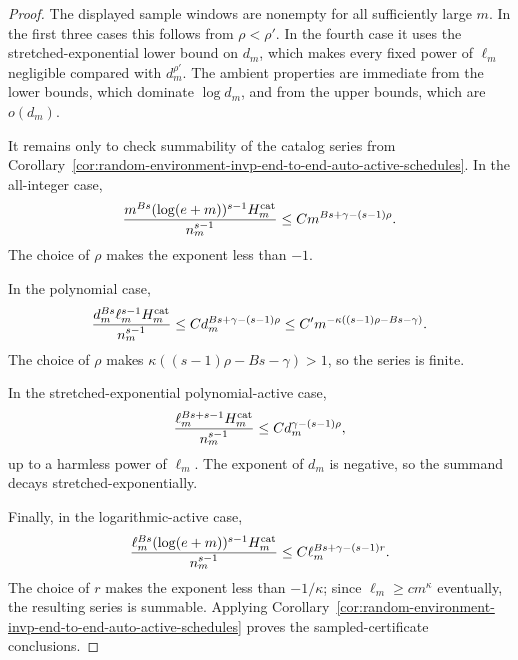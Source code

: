 \documentclass[11pt]{amsart}
\numberwithin{equation}{section}
\theoremstyle{definition}
\theoremstyle{remark}
\begin{document}
\begin{proof}
The displayed sample windows are nonempty for all sufficiently large \(m\).  In
the first three cases this follows from \(\rho<\rho'\).  In the fourth case it
uses the stretched-exponential lower bound on \(d_m\), which makes every fixed
power of \(\ell_m\) negligible compared with \(d_m^{\rho'}\).  The ambient
properties are immediate from the lower bounds, which dominate \(\log d_m\), and
from the upper bounds, which are \(o(d_m)\).

It remains only to check summability of the catalog series from
Corollary~\ref{cor:random-environment-invp-end-to-end-auto-active-schedules}.
In the all-integer case,
\[
  \frac{m^{Bs}(\log(e+m))^{s-1}H_m^{\rm cat}}{n_m^{s-1}}
  \le
  C m^{Bs+\gamma-(s-1)\rho}.
\]
The choice of \(\rho\) makes the exponent less than \(-1\).

In the polynomial case,
\[
  \frac{d_m^{Bs}\ell_m^{s-1}H_m^{\rm cat}}{n_m^{s-1}}
  \le
  C d_m^{Bs+\gamma-(s-1)\rho}
  \le C' m^{-\kappa((s-1)\rho-Bs-\gamma)} .
\]
The choice of \(\rho\) makes
\(\kappa((s-1)\rho-Bs-\gamma)>1\), so the series is finite.

In the stretched-exponential polynomial-active case,
\[
  \frac{\ell_m^{Bs+s-1}H_m^{\rm cat}}{n_m^{s-1}}
  \le
  C d_m^{\gamma-(s-1)\rho},
\]
up to a harmless power of \(\ell_m\).  The exponent of \(d_m\) is negative, so
the summand decays stretched-exponentially.

Finally, in the logarithmic-active case,
\[
  \frac{\ell_m^{Bs}(\log(e+m))^{s-1}H_m^{\rm cat}}{n_m^{s-1}}
  \le
  C\ell_m^{Bs+\gamma-(s-1)r}.
\]
The choice of \(r\) makes the exponent less than \(-1/\kappa\); since
\(\ell_m\ge c m^\kappa\) eventually, the resulting series is summable.
Applying
Corollary~\ref{cor:random-environment-invp-end-to-end-auto-active-schedules}
proves the sampled-certificate conclusions.
\end{proof}
\end{document}
